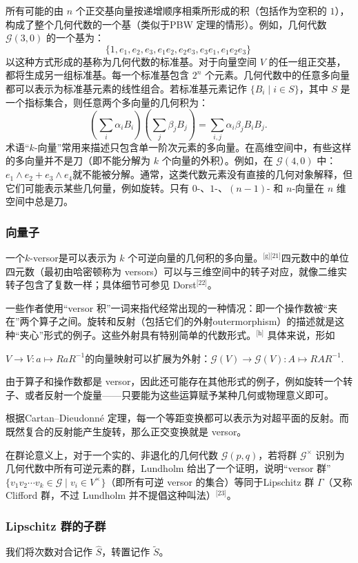 所有可能的由 $n$ 个正交基向量按递增顺序相乘所形成的积（包括作为空积的 $1$），构成了整个几何代数的一个基（类似于PBW 定理的情形）。例如，几何代数 $\mathcal{G}(3,0)$ 的一个基为：
$$
\{1, e_{1}, e_{2}, e_{3}, e_{1}e_{2}, e_{2}e_{3}, e_{3}e_{1}, e_{1}e_{2}e_{3}\}~
$$
以这种方式形成的基称为几何代数的标准基。对于向量空间 $V$ 的任一组正交基，都将生成另一组标准基。每一个标准基包含 $2^n$ 个元素。几何代数中的任意多向量都可以表示为标准基元素的线性组合。若标准基元素记作 $\{B_i \mid i \in S\}$，其中 $S$ 是一个指标集合，则任意两个多向量的几何积为：
$$
\left(\sum_{i} \alpha_i B_i\right)\left(\sum_{j} \beta_j B_j\right)
= \sum_{i,j} \alpha_i \beta_j B_i B_j .~
$$
术语“$k$-向量”常用来描述只包含单一阶次元素的多向量。在高维空间中，有些这样的多向量并不是刀（即不能分解为 $k$ 个向量的外积）。例如，在 $\mathcal{G}(4,0)$ 中：$e_1 \wedge e_2 + e_3 \wedge e_4$就不能被分解。通常，这类代数元素没有直接的几何对象解释，但它们可能表示某些几何量，例如旋转。只有 $0$-、$1$-、$(n-1)$- 和 $n$-向量在 $n$ 维空间中总是刀。
\subsubsection{向量子}
一个$k$-versor是可以表示为 $k$ 个可逆向量的几何积的多向量。\(^\text{[g][21]}\)四元数中的单位四元数（最初由哈密顿称为 versors）可以与三维空间中的转子对应，就像二维实转子包含了复数一样；具体细节可参见 Dorst\(^\text{[22]}\)。

一些作者使用“versor 积”一词来指代经常出现的一种情况：即一个操作数被“夹在”两个算子之间。旋转和反射（包括它们的外射outermorphism）的描述就是这种“夹心”形式的例子。这些外射具有特别简单的代数形式。\(^\text{[h]}\) 具体来说，形如

$V \to V : a \mapsto RaR^{-1}$的向量映射可以扩展为外射：$\mathcal{G}(V) \to \mathcal{G}(V) : A \mapsto RAR^{-1}$.

由于算子和操作数都是 versor，因此还可能存在其他形式的例子，例如旋转一个转子、或者反射一个旋量——只要能为这些运算赋予某种几何或物理意义即可。

根据Cartan–Dieudonné 定理，每一个等距变换都可以表示为对超平面的反射。而既然复合的反射能产生旋转，那么正交变换就是 versor。

在群论意义上，对于一个实的、非退化的几何代数 $\mathcal{G}(p,q)$，若将群 $\mathcal{G}^{\times}$ 识别为几何代数中所有可逆元素的群，Lundholm 给出了一个证明，说明“versor 群”$\{v_{1} v_{2}\cdots v_{k} \in \mathcal{G} \mid v_{i} \in V^{\times}\}$（即所有可逆 versor 的集合）等同于Lipschitz 群 $\Gamma$（又称 Clifford 群，不过 Lundholm 并不提倡这种叫法）\(^\text{[23]}\)。
\subsubsection{Lipschitz 群的子群}
我们将次数对合记作 $\widehat{S}$，转置记作 $\widetilde{S}$。

